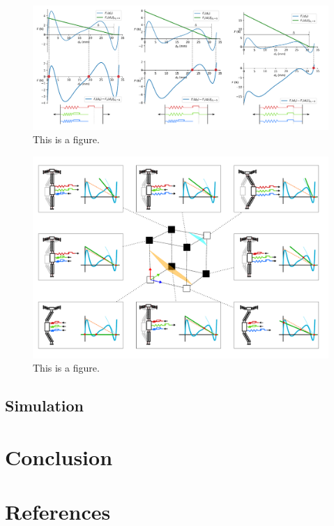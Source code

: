 \begin{figure}
    \centering
    \includegraphics[width=\textwidth]{images/SVGs/Equilibria2.pdf}
    \caption{This is a figure.}
    \label{fig:Equilibria under actuation}
\end{figure}

\begin{figure}
    \centering
    \includegraphics[width=\textwidth]{images/SVGs/Equilibria3.pdf}
    \caption{This is a figure.}
    \label{fig:Equilibria corresponding to Rule 110}
\end{figure}

\subsection*{Simulation}
\section{Conclusion}
\section{References}